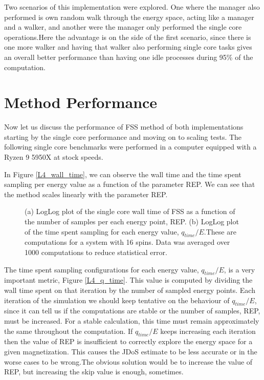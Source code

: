 	Two scenarios of this implementation were explored. One where the manager also performed is own random walk through the energy space, acting like a manager and a walker, and another were the manager only performed the single core operations.Here the advantage is on the side of the first scenario, since there is one more walker and having that walker also performing single core tasks gives an overall better performance than having one idle processes during 95\% of the computation.


\section{Method Performance}

	Now let us discuss the performance of FSS method of both implementations starting by the single core performance and moving on to scaling tests. The following single core benchmarks were performed in a computer equipped with a Ryzen 9 5950X at stock speeds.  
	
	In Figure \ref{L4_wall_time}, we can observe the wall time and the time spent sampling per energy value as a function of the parameter REP. We can see that the method scales linearly with the parameter REP. 
	
\begin{figure}[ht]
\centering
{}
\quad
\quad
\quad
{}	

\caption{(a) LogLog plot of the single core wall time of FSS as a function of the number of samples per each energy point, REP.  (b) LogLog plot of the time spent sampling for each energy value, $q_{time}/E$.These are computations for a system with 16 spins. Data was averaged over 1000 computations to reduce statistical error.}
\label{wall_time_L4}
\end{figure}

	The time spent sampling configurations for each energy value, $q_{time}/E$, is a very important metric, Figure \ref{L4_q_time}. This value is computed by dividing the wall time spent on that iteration by the number of sampled energy points. Each iteration of the simulation we should keep tentative on the behaviour of $q_{time}/E$, since it can tell us if the computations are stable or the number of samples, REP, must be increased. 
For a stable calculation, this time must remain approximately the same throughout the computation. If $q_{time}/E$ keeps increasing each iteration then the value of REP is insufficient to correctly explore the energy space for a given magnetization. This causes the JDoS estimate to be less accurate or in the worse cases to be wrong.The obvious solution would be to increase the value of REP, but increasing the skip value is enough, sometimes.

